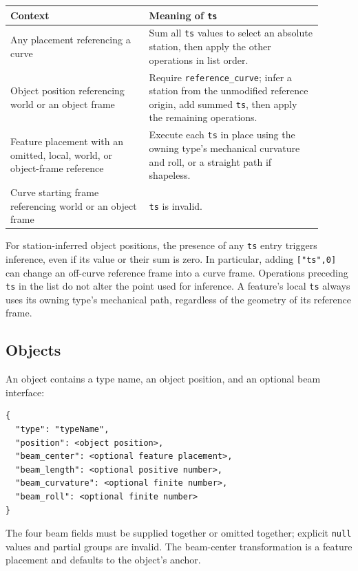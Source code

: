 \documentclass[11pt,a4paper]{article}
\begin{document}
\begin{center}
\small
\begin{tabular}{p{0.40\linewidth}p{0.50\linewidth}}
\toprule
Context & Meaning of \texttt{ts} \\
\midrule
Any placement referencing a curve & Sum all \texttt{ts} values to select an absolute station, then apply the other operations in list order. \\
Object position referencing world or an object frame & Require \texttt{reference\_curve}; infer a station from the unmodified reference origin, add summed \texttt{ts}, then apply the remaining operations. \\
Feature placement with an omitted, local, world, or object-frame reference & Execute each \texttt{ts} in place using the owning type's mechanical curvature and roll, or a straight path if shapeless. \\
Curve starting frame referencing world or an object frame & \texttt{ts} is invalid. \\
\bottomrule
\end{tabular}
\end{center}

For station-inferred object positions, the presence of any \texttt{ts}
entry triggers inference, even if its value or their sum is zero. In particular,
adding \texttt{["ts",0]} can change an off-curve reference frame into a curve
frame. Operations preceding \texttt{ts} in the list do not alter the point
used for inference. A feature's local \texttt{ts} always uses its owning
type's mechanical path, regardless of the geometry of its reference frame.

\subsection{Objects}

An object contains a type name, an object position, and an optional beam
interface:
\begin{lstlisting}
{
  "type": "typeName",
  "position": <object position>,
  "beam_center": <optional feature placement>,
  "beam_length": <optional positive number>,
  "beam_curvature": <optional finite number>,
  "beam_roll": <optional finite number>
}
\end{lstlisting}
The four beam fields must be supplied together or omitted together; explicit
\texttt{null} values and partial groups are invalid. The beam-center
transformation is a feature placement and defaults to the object's anchor.
\end{document}
